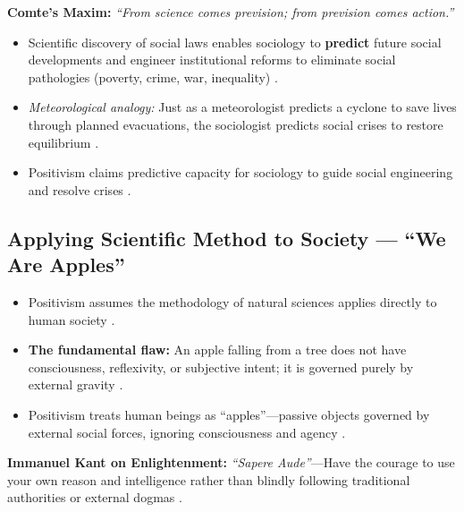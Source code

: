 \begin{KeyConcept}
\textbf{Comte's Maxim:} \textit{``From science comes prevision; from prevision comes action.''} 
\begin{itemize}
    \item Scientific discovery of social laws enables sociology to \textbf{predict} future social developments and engineer institutional reforms to eliminate social pathologies (poverty, crime, war, inequality) .
    \item \textit{Meteorological analogy:} Just as a meteorologist predicts a cyclone to save lives through planned evacuations, the sociologist predicts social crises to restore equilibrium .
\end{itemize}
\end{KeyConcept}

\begin{QuickRevision}
\begin{itemize}
    \item Positivism claims predictive capacity for sociology to guide social engineering and resolve crises .
\end{itemize}
\end{QuickRevision}

\subsection{Applying Scientific Method to Society --- ``We Are Apples''}

\begin{CriticalPoint}
\begin{itemize}
    \item Positivism assumes the methodology of natural sciences applies directly to human society .
    \item \textbf{The fundamental flaw:} An apple falling from a tree does not have consciousness, reflexivity, or subjective intent; it is governed purely by external gravity .
    \item Positivism treats human beings as ``apples''---passive objects governed by external social forces, ignoring consciousness and agency .
\end{itemize}
\end{CriticalPoint}

\begin{KeyConcept}
\textbf{Immanuel Kant on Enlightenment:} \textit{``Sapere Aude''}---Have the courage to use your own reason and intelligence rather than blindly following traditional authorities or external dogmas .
\end{KeyConcept}

